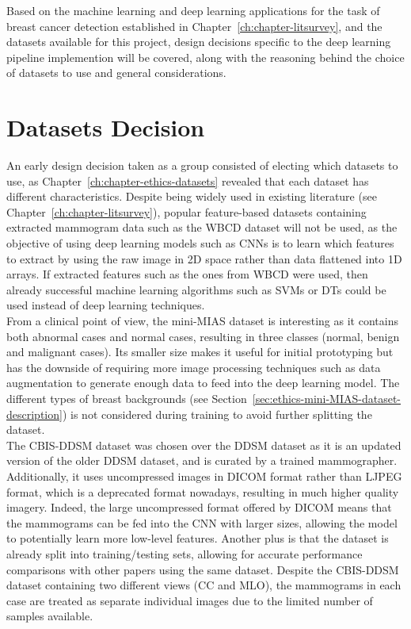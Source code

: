 Based on the machine learning and deep learning applications for the task of breast cancer detection established in Chapter~\ref{ch:chapter-litsurvey}, and the datasets available for this project, design decisions specific to the deep learning pipeline implemention will be covered, along with the reasoning behind the choice of datasets to use and general considerations.

\section{Datasets Decision}

An early design decision taken as a group consisted of electing which datasets to use, as Chapter~\ref{ch:chapter-ethics-datasets} revealed that each dataset has different characteristics. Despite being widely used in existing literature (see Chapter~\ref{ch:chapter-litsurvey}), popular feature-based datasets containing extracted mammogram data such as the WBCD dataset \citep{Wolberg1995} will not be used, as the objective of using deep learning models such as CNNs is to learn which features to extract by using the raw image in 2D space rather than data flattened into 1D arrays. If extracted features such as the ones from WBCD were used, then already successful machine learning algorithms such as SVMs or DTs could be used instead of deep learning techniques.\\

From a clinical point of view, the mini-MIAS dataset is interesting as it contains both abnormal cases and normal cases, resulting in three classes (normal, benign and malignant cases). Its smaller size makes it useful for initial prototyping but has the downside of requiring more image processing techniques such as data augmentation to generate enough data to feed into the deep learning model. The different types of breast backgrounds (see Section~\ref{sec:ethics-mini-MIAS-dataset-description}) is not considered during training to avoid further splitting the dataset.\\

The CBIS-DDSM dataset was chosen over the DDSM dataset as it is an updated version of the older DDSM dataset, and is curated by a trained mammographer. Additionally, it uses uncompressed images in DICOM format rather than LJPEG format, which is a deprecated format nowadays, resulting in much higher quality imagery.  Indeed, the large uncompressed format offered by DICOM means that the mammograms can be fed into the CNN with larger sizes, allowing the model to potentially learn more low-level features. Another plus is that the dataset is already split into training/testing sets, allowing for accurate performance comparisons with other papers using the same dataset. Despite the CBIS-DDSM dataset containing two different views (CC and MLO), the mammograms in each case are treated as separate individual images due to the limited number of samples available.\\

